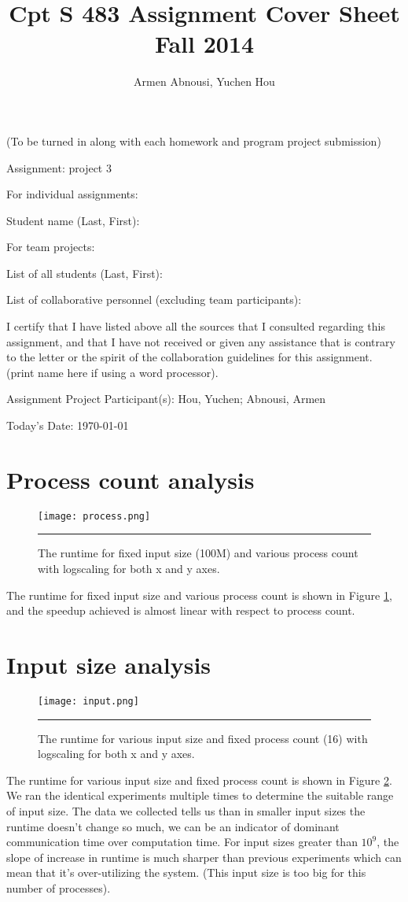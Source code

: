 \documentclass[12pt]{article}
\begin{document}
\title{Cpt S 483 Assignment Cover Sheet \\ Fall 2014
}
\author{Armen Abnousi, Yuchen Hou}
\maketitle

(To be turned in along with each homework and program project submission)

Assignment: project 3

For individual assignments:

Student name (Last, First):

For team projects:

List of all students (Last, First):

List of collaborative personnel (excluding team participants):

I certify that I have listed above all the sources that I consulted regarding this assignment, and that I have not received or given any assistance that is contrary to the letter or the spirit of the collaboration guidelines for this assignment. (print name here if using a word processor).

Assignment Project Participant(s): Hou, Yuchen; Abnousi, Armen

Today's Date: \today

\pagebreak

\section{Process count analysis}
\begin{figure}[htb]
  \centering
      {\texttt{[image: process.png]}} \rule{1\linewidth}{1pt}
      \caption{The runtime for fixed input size (100M) and various process count with logscaling for both x and y axes.}
      \label{fig:process}
\end{figure}
The runtime for fixed input size and various process count is shown in Figure \ref{fig:process}, and the speedup achieved is almost linear with respect to process count.
\section{Input size analysis}
\begin{figure}[htb]
  \centering
      {\texttt{[image: input.png]}} \rule{1\linewidth}{1pt}
      \caption{The runtime for various input size and fixed process count (16) with logscaling for both x and y axes.}
      \label{fig:input}
\end{figure}
The runtime for various input size and fixed process count is shown in Figure \ref{fig:input}. We ran the identical experiments multiple times to determine the suitable range of input size. 
The data we collected tells us than in smaller input sizes the runtime doesn't change so much, we can be an indicator of dominant communication time over computation time.
For input sizes greater than $10^9$, the slope of increase in runtime is much sharper than previous experiments which can mean that it's over-utilizing the system. (This input size is too big for this number of processes).
\end{document}
